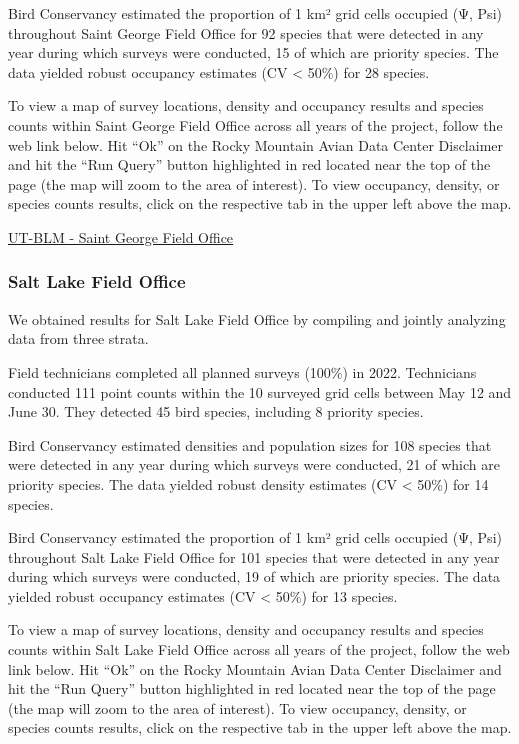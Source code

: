 \documentclass[
  letterpaper,
  DIV=11,
  numbers=noendperiod,
  oneside]{scrreprt}
\begin{document}
Bird Conservancy estimated the proportion of 1 km² grid cells occupied
(Ψ, Psi) throughout Saint George Field Office for 92 species that were
detected in any year during which surveys were conducted, 15 of which
are priority species. The data yielded robust occupancy estimates (CV
\textless{} 50\%) for 28 species.

To view a map of survey locations, density and occupancy results and
species counts within Saint George Field Office across all years of the
project, follow the web link below. Hit ``Ok'' on the Rocky Mountain
Avian Data Center Disclaimer and hit the ``Run Query'' button
highlighted in red located near the top of the page (the map will zoom
to the area of interest). To view occupancy, density, or species counts
results, click on the respective tab in the upper left above the map.

\href{http://www.rmbo.org/new_site/adc/QueryWindow.aspx\#N4IgzgrgDgpgTmALnAhoiBbEAuABCAVQBUBaAIQBkBZXE3AZRQEsA7RXAcRgHs4BzGLgBiTGABsAJrgDyAM1lMAxjBABfIA=}{UT-BLM
- Saint George Field Office}

\hypertarget{salt-lake-field-office}{%
\subsubsection{Salt Lake Field Office}\label{salt-lake-field-office}}

We obtained results for Salt Lake Field Office by compiling and jointly
analyzing data from three strata.

Field technicians completed all planned surveys (100\%) in 2022.
Technicians conducted 111 point counts within the 10 surveyed grid cells
between May 12 and June 30. They detected 45 bird species, including 8
priority species.

Bird Conservancy estimated densities and population sizes for 108
species that were detected in any year during which surveys were
conducted, 21 of which are priority species. The data yielded robust
density estimates (CV \textless{} 50\%) for 14 species.

Bird Conservancy estimated the proportion of 1 km² grid cells occupied
(Ψ, Psi) throughout Salt Lake Field Office for 101 species that were
detected in any year during which surveys were conducted, 19 of which
are priority species. The data yielded robust occupancy estimates (CV
\textless{} 50\%) for 13 species.

To view a map of survey locations, density and occupancy results and
species counts within Salt Lake Field Office across all years of the
project, follow the web link below. Hit ``Ok'' on the Rocky Mountain
Avian Data Center Disclaimer and hit the ``Run Query'' button
highlighted in red located near the top of the page (the map will zoom
to the area of interest). To view occupancy, density, or species counts
results, click on the respective tab in the upper left above the map.
\end{document}
